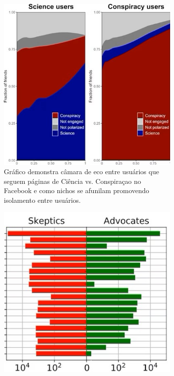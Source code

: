 \begin{figure}[htbp]
	\centering
	\begin{subfigure}{0.3\textwidth}
		\includegraphics[width=\linewidth]{images/echo_chamber_graph_a.jpg}
		\caption{Gráfico demonstra câmara de eco entre usuários que seguem páginas de Ciência vs. Conspiraçao no Facebook e como nichos se afunilam promovendo isolamento entre usuários.}
		\label{fig:echo_chamber_graph_a}
	\end{subfigure}
	\hfill
	\begin{subfigure}{0.3\textwidth}
		\includegraphics[width=\linewidth]{images/echo_chamber_graph_b.jpg}

\end{subfigure}
\end{figure}
